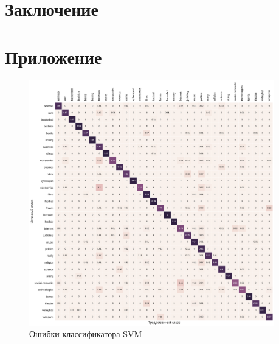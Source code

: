 \documentclass[a4paper, 14pt]{extarticle}
\begin{document}
\section{Заключение}



\section*{Приложение}
\begin{figure}[h!]
	\centering
	\includegraphics[width=0.95\textwidth]{svm_matrix}
	\caption{Ошибки классификатора SVM}
	\label{svm_matrix}
\end{figure}
\end{document}

